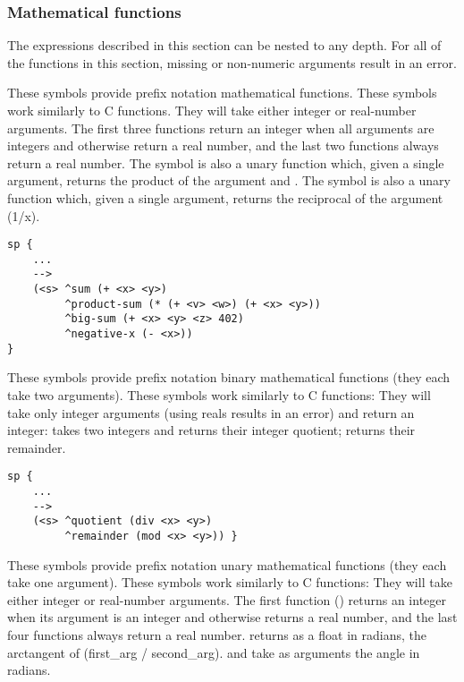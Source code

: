 \subsubsection{Mathematical functions}

The expressions described in this section can be nested to any depth. For all
of the functions in this section, missing or non-numeric arguments result 
in an error.


\begin{description}
\item [\soarb{+, -, *, /} --- ]
        These symbols provide prefix notation mathematical functions.
        These symbols work similarly to C functions.  They will take either 
        integer or real-number arguments. The first three functions return 
        an integer when all arguments are integers
        and otherwise return a real number, and the last two functions
        always return a real number.  The \soar{-} symbol is also a
	unary function which, given a single argument, returns the
	product of the argument and .  The \soar{/} symbol is
	also a unary function which, given a single argument, returns the
	reciprocal of the argument (1/x).

\begin{verbatim}
sp {
    ...
    -->
    (<s> ^sum (+ <x> <y>)
         ^product-sum (* (+ <v> <w>) (+ <x> <y>))
         ^big-sum (+ <x> <y> <z> 402)
         ^negative-x (- <x>))
}
\end{verbatim}

\item [\soarb{div, mod} --- ]
        These symbols provide prefix notation binary mathematical functions
        (they each take two arguments). These symbols work similarly to C
        functions: They will take only integer arguments (using reals results
        in an error) and return an integer:  takes two integers and
        returns their integer quotient;  returns their remainder.

\begin{verbatim}
sp {
    ...
    -->
    (<s> ^quotient (div <x> <y>)
         ^remainder (mod <x> <y>)) }
\end{verbatim}

\item [\soarb{abs, atan2, sqrt, sin, cos} --- ]   
        These symbols provide prefix notation unary mathematical functions
        (they each take one argument). These symbols work similarly to C
        functions: They will take either integer or real-number arguments. The
        first function () returns an integer when its argument is an
        integer and otherwise returns a real number, and the last four
        functions always return a real number.   returns as
	a float in radians, the arctangent of (first\_arg / second\_arg).
	 and  take as arguments the angle in radians.


\end{description}
